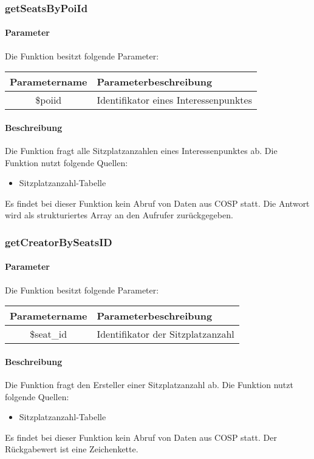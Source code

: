 \subsubsection{getSeatsByPoiId}
\paragraph{Parameter} Die Funktion besitzt folgende Parameter:
\begin{table}[H]
	\begin{tabular}{|c|p{11cm}|}
		\hline
		\textbf{Parametername} & \textbf{Parameterbeschreibung} \\ \hline
		\$poiid & Identifikator eines Interessenpunktes \\ \hline
	\end{tabular}
\end{table}
\paragraph{Beschreibung} Die Funktion fragt alle Sitzplatzanzahlen eines Interessenpunktes ab. Die Funktion nutzt folgende Quellen:
\begin{itemize}
	\item Sitzplatzanzahl-Tabelle
\end{itemize}
Es findet bei dieser Funktion kein Abruf von Daten aus {\glqq COSP\grqq} statt. Die Antwort wird als strukturiertes Array an den Aufrufer zurückgegeben.
\subsubsection{getCreatorBySeatsID}
\paragraph{Parameter} Die Funktion besitzt folgende Parameter:
\begin{table}[H]
	\begin{tabular}{|c|p{11cm}|}
		\hline
		\textbf{Parametername} & \textbf{Parameterbeschreibung} \\ \hline
		\$seat\_id & Identifikator der Sitzplatzanzahl \\ \hline
	\end{tabular}
\end{table}
\paragraph{Beschreibung} Die Funktion fragt den Ersteller einer Sitzplatzanzahl ab. Die Funktion nutzt folgende Quellen:
\begin{itemize}
	\item Sitzplatzanzahl-Tabelle
\end{itemize}
Es findet bei dieser Funktion kein Abruf von Daten aus {\glqq COSP\grqq} statt. Der Rückgabewert ist eine Zeichenkette.
